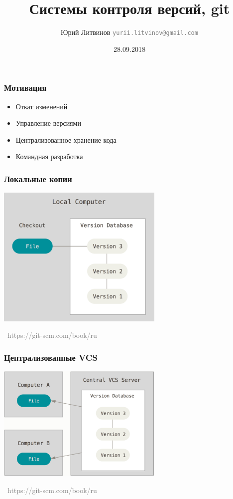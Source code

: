\documentclass[xetex,mathserif,serif]{beamer}
\title{Системы контроля версий, git}
\author[Юрий Литвинов]{Юрий Литвинов \newline \textcolor{gray}{\small\texttt{yurii.litvinov@gmail.com}}}
\date{28.09.2018}
\newcommand{\attribution}[1] {
	\vspace{-5mm}\begin{flushright}\begin{scriptsize}\textcolor{gray}{\textcopyright\, #1}\end{scriptsize}\end{flushright}
}
\begin{document}
	
	\frame{\titlepage}
	
	\begin{frame}
		\frametitle{Мотивация}
		\begin{itemize}
			\item Откат изменений
			\item Управление версиями
			\item Централизованное хранение кода
			\item Командная разработка
		\end{itemize}
	\end{frame}

	\begin{frame}
		\frametitle{Локальные копии}
		\begin{center}
			\includegraphics[width=0.6\textwidth]{localCopies.png}
			\attribution{https://git-scm.com/book/ru}
		\end{center}
	\end{frame}

	\begin{frame}
		\frametitle{Централизованные VCS}
		\begin{center}
			\includegraphics[width=0.6\textwidth]{centralizedVcs.png}
			\attribution{https://git-scm.com/book/ru}
		\end{center}
	\end{frame}
\end{document}
